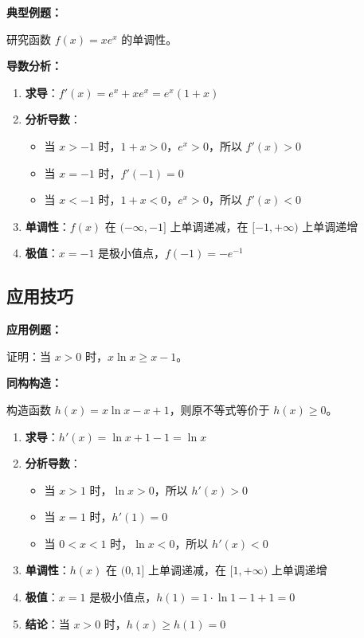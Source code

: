 \documentclass[a4paper,11pt]{ctexrep}
\newcommand{\exampleicon}{\ModeBadge[highlight]{例题}}
\newcommand{\analysisicon}{\ModeBadge[secondary]{分析}}
\theoremstyle{definition}
\begin{document}
\exampleicon \textbf{典型例题：}

研究函数 $f(x) = xe^x$ 的单调性。

\analysisicon \textbf{导数分析：}

\begin{enumerate}
    \item \textbf{求导}：$f'(x) = e^x + xe^x = e^x(1+x)$
    \item \textbf{分析导数}：
    \begin{itemize}
        \item 当 $x > -1$ 时，$1+x > 0$，$e^x > 0$，所以 $f'(x) > 0$
        \item 当 $x = -1$ 时，$f'(-1) = 0$
        \item 当 $x < -1$ 时，$1+x < 0$，$e^x > 0$，所以 $f'(x) < 0$
    \end{itemize}
    \item \textbf{单调性}：$f(x)$ 在 $(-\infty, -1]$ 上单调递减，在 $[-1, +\infty)$ 上单调递增
    \item \textbf{极值}：$x = -1$ 是极小值点，$f(-1) = -e^{-1}$
\end{enumerate}

\subsection{应用技巧}

\exampleicon \textbf{应用例题：}

证明：当 $x > 0$ 时，$x\ln x \geq x - 1$。

\analysisicon \textbf{同构构造：}

构造函数 $h(x) = x\ln x - x + 1$，则原不等式等价于 $h(x) \geq 0$。

\begin{enumerate}
    \item \textbf{求导}：$h'(x) = \ln x + 1 - 1 = \ln x$
    \item \textbf{分析导数}：
    \begin{itemize}
        \item 当 $x > 1$ 时，$\ln x > 0$，所以 $h'(x) > 0$
        \item 当 $x = 1$ 时，$h'(1) = 0$
        \item 当 $0 < x < 1$ 时，$\ln x < 0$，所以 $h'(x) < 0$
    \end{itemize}
    \item \textbf{单调性}：$h(x)$ 在 $(0, 1]$ 上单调递减，在 $[1, +\infty)$ 上单调递增
    \item \textbf{极值}：$x = 1$ 是极小值点，$h(1) = 1 \cdot \ln 1 - 1 + 1 = 0$
    \item \textbf{结论}：当 $x > 0$ 时，$h(x) \geq h(1) = 0$
\end{enumerate}
\end{document}
